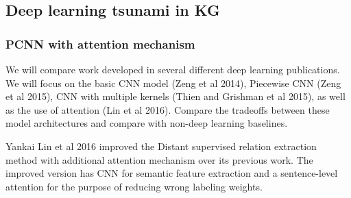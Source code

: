 \documentclass{article}
\begin{document}
\subsection{Deep learning tsunami in KG}

\subsubsection{PCNN with attention mechanism}
	We will compare work developed in several different deep learning publications. We will focus on the basic CNN model (Zeng et al 2014), Piecewise CNN (Zeng et al 2015), CNN with multiple kernels (Thien and Grishman et al 2015), as well as the use of attention (Lin et al 2016). Compare the tradeoffs between these model architectures and compare with non-deep learning baselines. \citet{DBLP:conf/acl/LinSLLS16}
	
	Yankai Lin et al 2016 improved the Distant supervised relation extraction method with additional attention mechanism over its previous work. The improved version has CNN for semantic feature extraction and a sentence-level attention for the purpose of reducing wrong labeling weights. 
	
\end{document}
